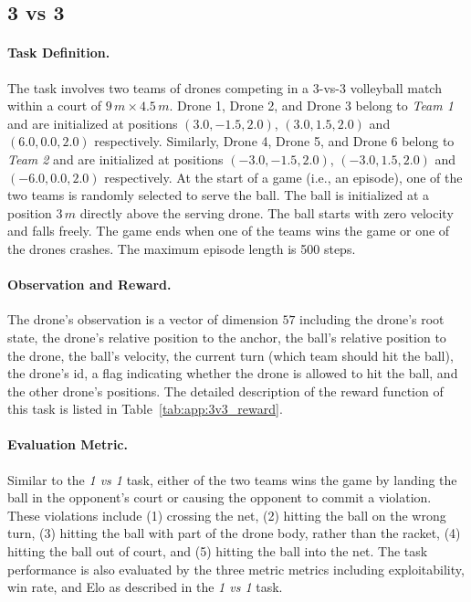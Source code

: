 
\subsection{3 vs 3}

\paragraph{Task Definition.}
The task involves two teams of drones competing in a 3-vs-3 volleyball match within a court of $9\,m \times 4.5\,m$.
Drone 1, Drone 2, and Drone 3 belong to \textit{Team 1} and are initialized at positions $(3.0, -1.5, 2.0)$, $(3.0, 1.5, 2.0)$ and $(6.0, 0.0, 2.0)$ respectively. Similarly, Drone 4, Drone 5, and Drone 6 belong to \textit{Team 2} and are initialized at positions $(-3.0, -1.5, 2.0)$, $(-3.0, 1.5, 2.0)$ and $(-6.0, 0.0, 2.0)$ respectively. At the start of a game (i.e., an episode), one of the two teams is randomly selected to serve the ball. The ball is initialized at a position $3\,m$ directly above the serving drone. The ball starts with zero velocity and falls freely. The game ends when one of the teams wins the game or one of the drones crashes. The maximum episode length is 500 steps.

\paragraph{Observation and Reward.}
The drone's observation is a vector of dimension $57$ including the drone's root state, the drone's relative position to the anchor, the ball's relative position to the drone, the ball's velocity, the current turn (which team should hit the ball), the drone's id, a flag indicating whether the drone is allowed to hit the ball, and the other drone's positions. The detailed description of the reward function of this task is listed in Table~\ref{tab:app:3v3_reward}.

\paragraph{Evaluation Metric.}
Similar to the \textit{1 vs 1} task, either of the two teams wins the game by landing the ball in the opponent's court or causing the opponent to commit a violation. These violations include (1) crossing the net, (2) hitting the ball on the wrong turn, (3) hitting the ball with part of the drone body, rather than the racket, (4) hitting the ball out of court, and (5) hitting the ball into the net. The task performance is also evaluated by the three metric metrics including exploitability, win rate, and Elo as described in the \textit{1 vs 1} task.



